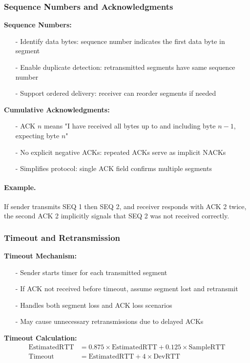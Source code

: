 \documentclass[../../compsys.tex]{subfiles}
\begin{document}
\subsubsection{Sequence Numbers and Acknowledgments}
\textbf{Sequence Numbers:}
\begin{itemize}
  \item[-] Identify data bytes: sequence number indicates the first data byte in segment
  \item[-] Enable duplicate detection: retransmitted segments have same sequence number
  \item[-] Support ordered delivery: receiver can reorder segments if needed
\end{itemize}

\textbf{Cumulative Acknowledgments:}
\begin{itemize}
  \item[-] ACK $n$ means "I have received all bytes up to and including byte $n-1$, expecting byte $n$"
  \item[-] No explicit negative ACKs: repeated ACKs serve as implicit NACKs
  \item[-] Simplifies protocol: single ACK field confirms multiple segments
\end{itemize}

\paragraph{Example.} If sender transmits SEQ 1 then SEQ 2, and receiver responds with ACK 2 twice, the second ACK 2 implicitly signals that SEQ 2 was not received correctly.

\subsubsection{Timeout and Retransmission}
\textbf{Timeout Mechanism:}
\begin{itemize}
  \item[-] Sender starts timer for each transmitted segment
  \item[-] If ACK not received before timeout, assume segment lost and retransmit
  \item[-] Handles both segment loss and ACK loss scenarios
  \item[-] May cause unnecessary retransmissions due to delayed ACKs
\end{itemize}

\textbf{Timeout Calculation:}
\begin{align}
\text{EstimatedRTT} &= 0.875 \times \text{EstimatedRTT} + 0.125 \times \text{SampleRTT} \\
\text{Timeout} &= \text{EstimatedRTT} + 4 \times \text{DevRTT}
\end{align}
\end{document}
